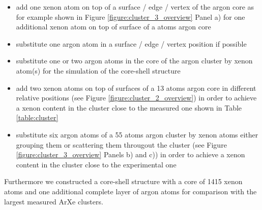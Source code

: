 \begin{itemize}
 \item add one xenon atom on top of a surface / edge / vertex of
       the argon core as for example shown in
       Figure \ref{figure:cluster_3_overview} Panel a)
       for one additional xenon atom
       on top of surface of a \unit[55]{atoms} argon core
 \item substitute one argon atom in a surface / edge / vertex position if
       possible
 \item substitute one or two argon atoms in the core of the argon cluster
       by xenon atom(s) for the simulation of the core-shell structure
 \item add two xenon atoms on top of surfaces of a 13 atoms argon core
       in different relative positions (see Figure
       \ref{figure:cluster_2_overview})
       in order to achieve a xenon content in the cluster close to the
       measured one shown in Table \ref{table:cluster}
 \item substitute six argon atoms of a 55 atoms argon cluster by xenon
       atoms either grouping them or scattering them througout the cluster
       (see Figure \ref{figure:cluster_3_overview} Panels b) and c)) in order to
       achieve a xenon content in the cluster close to the experimental one
\end{itemize}

Furthermore we constructed a core-shell structure with a core of
1415 xenon atoms and one additional complete layer of argon atoms for
comparison with the largest measured ArXe clusters.


